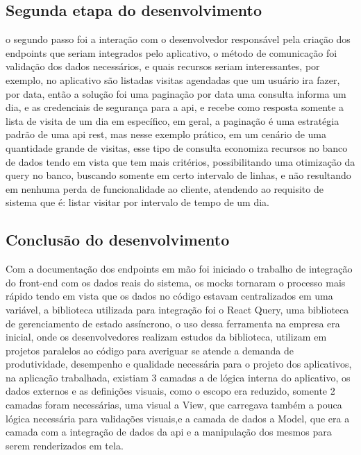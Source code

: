 \documentclass{ufersa}
\begin{document}
\subsection{Segunda etapa do desenvolvimento}
o segundo passo foi a interação com o desenvolvedor responsável pela criação dos endpoints que seriam integrados pelo aplicativo, o método de comunicação foi validação dos dados necessários, e quais recursos seriam interessantes, por exemplo, no aplicativo são listadas visitas agendadas que um usuário ira fazer, por data, então a solução foi uma paginação por data uma consulta informa um dia, e as credenciais de segurança para a api, e recebe como resposta somente a lista de visita de um dia em específico, em geral, a paginação é uma estratégia padrão de uma api rest, mas nesse exemplo prático, em um cenário de uma quantidade grande de visitas, esse tipo de consulta economiza recursos no banco de dados tendo em vista que tem mais critérios, possibilitando uma otimização da query no banco, buscando somente em certo intervalo de linhas, e não resultando em nenhuma perda de funcionalidade ao cliente, atendendo ao requisito de sistema que é: listar visitar por intervalo de tempo de um dia.


\subsection{Conclusão do desenvolvimento}
Com a documentação dos endpoints em mão foi iniciado o trabalho de integração do front-end com os dados reais do sistema, os mocks tornaram o processo mais rápido tendo em vista que os dados no código estavam centralizados em uma variável, a biblioteca utilizada para integração foi o React Query, uma biblioteca de gerenciamento de estado assíncrono, o uso dessa ferramenta na empresa era inicial, onde os desenvolvedores realizam estudos da biblioteca, utilizam em projetos paralelos ao código para averiguar se atende a demanda de produtividade, desempenho e qualidade necessária para o projeto dos aplicativos, na aplicação trabalhada, existiam 3 camadas a de lógica interna do aplicativo, os dados externos e as definições visuais, como o escopo era reduzido, somente 2 camadas foram necessárias, uma visual a View, que carregava também a pouca lógica necessária para validações visuais,e a camada de dados a Model, que era a camada com a integração de dados da api e a manipulação dos mesmos para serem renderizados em tela.
\end{document}
